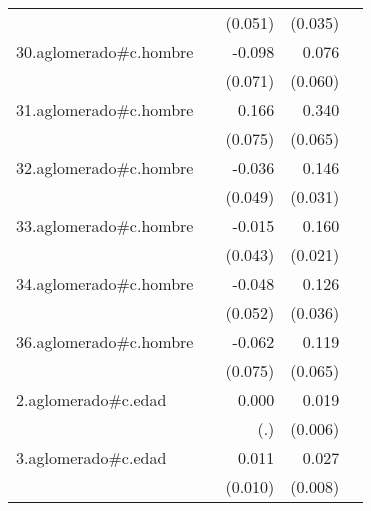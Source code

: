 {\begin{longtable}{l*{4}{D{.}{.}{-1}}}
            &                     &     (0.051)         &     (0.035)         &                     \\
\addlinespace
30.aglomerado#c.hombre&                     &      -0.098         &       0.076         &                     \\
            &                     &     (0.071)         &     (0.060)         &                     \\
\addlinespace
31.aglomerado#c.hombre&                     &       0.166\sym{*}  &       0.340\sym{***}&                     \\
            &                     &     (0.075)         &     (0.065)         &                     \\
\addlinespace
32.aglomerado#c.hombre&                     &      -0.036         &       0.146\sym{***}&                     \\
            &                     &     (0.049)         &     (0.031)         &                     \\
\addlinespace
33.aglomerado#c.hombre&                     &      -0.015         &       0.160\sym{***}&                     \\
            &                     &     (0.043)         &     (0.021)         &                     \\
\addlinespace
34.aglomerado#c.hombre&                     &      -0.048         &       0.126\sym{***}&                     \\
            &                     &     (0.052)         &     (0.036)         &                     \\
\addlinespace
36.aglomerado#c.hombre&                     &      -0.062         &       0.119         &                     \\
            &                     &     (0.075)         &     (0.065)         &                     \\
\addlinespace
2.aglomerado#c.edad&                     &       0.000         &       0.019\sym{**} &                     \\
            &                     &         (.)         &     (0.006)         &                     \\
\addlinespace
3.aglomerado#c.edad&                     &       0.011         &       0.027\sym{***}&                     \\
            &                     &     (0.010)         &     (0.008)         &                     \\

\end{longtable}}
